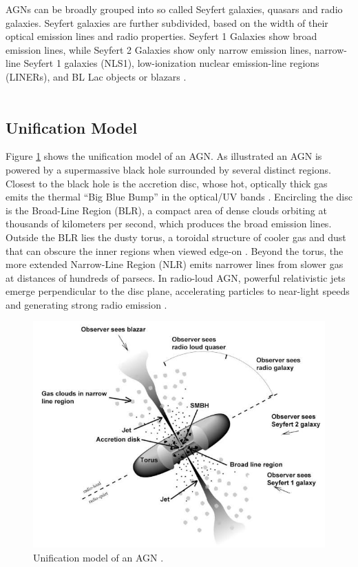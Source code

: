 AGNs can be broadly grouped into so called Seyfert galaxies, quasars and radio galaxies. Seyfert galaxies are further subdivided, based on the width of their optical emission lines and radio properties. Seyfert 1 Galaxies show broad emission lines, while Seyfert 2 Galaxies show only narrow emission lines, narrow-line Seyfert 1 galaxies (NLS1), low-ionization nuclear emission-line regions (LINERs), and BL Lac objects or blazars \parencite{antonucci1993unified,urry1995unified}.\\\\


\subsection{Unification Model}
Figure \ref{fig:agn_sed} shows the unification model of an AGN. 
As illustrated an AGN is powered by a supermassive black hole surrounded by several distinct regions. Closest to the black hole is the accretion disc, whose hot, optically thick gas emits the thermal “Big Blue Bump” in the optical/UV bands \parencite{peterson1997introduction}. Encircling the disc is the Broad-Line Region (BLR), a compact area of dense clouds orbiting at thousands of kilometers per second, which produces the broad emission lines. Outside the BLR lies the dusty torus, a toroidal structure of cooler gas and dust that can obscure the inner regions when viewed edge-on \parencite{antonucci1993unified}. Beyond the torus, the more extended Narrow-Line Region (NLR) emits narrower lines from slower gas at distances of hundreds of parsecs. In radio-loud AGN, powerful relativistic jets emerge perpendicular to the disc plane, accelerating particles to near-light speeds and generating strong radio emission \parencite{urry1995unified}.


\begin{figure}[!ht]
	\centering
	\includegraphics[width=\textwidth]{pictures/Chapter2/AGN_unified_model.jpg}
	\caption{Unification model of an AGN \parencite{fermi2025figure1}.}
	\label{fig:agn_sed}
\end{figure}



